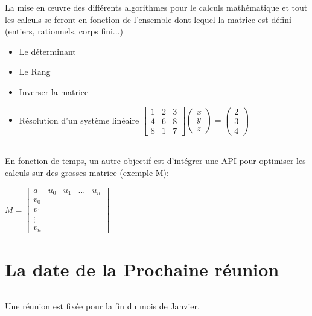 \documentclass[a4paper,11pt]{article}
\begin{document}
		\begin{doublespacing}	
La mise en œuvre des différents algorithmes pour le calculs mathématique et tout les calculs se feront en fonction de l'ensemble dont lequel la matrice est défini (entiers, rationnels, corps fini...)			
			\begin{itemize}
			\item Le déterminant 
			\item Le Rang
			\item Inverser la matrice 
			\item Résolution d'un système linéaire  
					\begin{math}
					\begin{bmatrix}
					1 & 2 & 3 \\
					4 & 6 & 8 \\
					8 & 1 & 7 
					\end{bmatrix}
					\begin{pmatrix}
					x \\
					y \\
					z
					\end{pmatrix}
					= 
					\begin{pmatrix}
					2 \\ 3 \\ 4
					\end{pmatrix}
					\end{math}
			\end{itemize}

\paragraph{}			
 En fonction de temps, un autre objectif est d'intégrer une API pour optimiser les calculs sur des grosses matrice (exemple M):
 
\end{doublespacing}	

	\begin{center}
		
\begin{math}
M=
\begin{bmatrix}

   a & u_{0} & u_{1} & \ldots & u_n \\
   v_{0}  \\
   v_{1} \\
   \vdots \\
   v_{n}
   
   
\end{bmatrix}
\end{math}
\end{center}	

\part*{ La date de la Prochaine réunion }
\paragraph{} Une réunion est fixée pour la fin du mois de Janvier.
\end{document}
